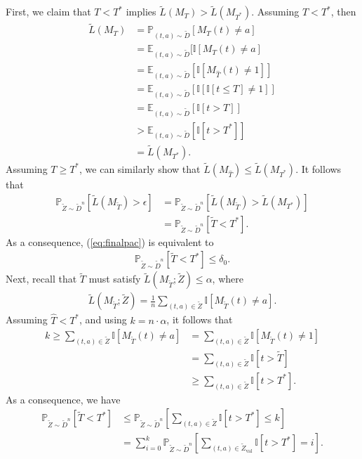 \documentclass{article} \usepackage{iclr2020_conference,times}
\renewcommand{\(}						{\left(}
\renewcommand{\)}						{\right)}
\renewcommand{\[}						{\left[}
\renewcommand{\]}						{\right]}
\newcommand{\<}						{\left<}
\renewcommand{\>}						{\right>}
\def\Th{\hat{{T}}}
\begin{document}
First, we claim that 
$T < T^*$ implies $\tilde{L}(M_T) > \tilde{L}(M_{T^*})$. Assuming $T < T^*$, then
\begin{align*}
\tilde{L}(M_T) 
&= \mathbb{P}_{(t,a)\sim\tilde{D}}[M_T(t)\neq a] \\
&= \mathbb{E}_{(t,a)\sim\tilde{D}}[\mathbb{I}[M_T (t)\neq a] \\
&= \mathbb{E}_{(t,a)\sim\tilde{D}}[\mathbb{I}[M_{\Th} (t)\neq 1]] \\
&= \mathbb{E}_{(t,a)\sim\tilde{D}}\left[\mathbb{I}[ \mathbb{I}[ t \leq T ] \neq 1]\right] \\
&= \mathbb{E}_{(t,a)\sim\tilde{D}}\left[\mathbb{I}[ t > T ]\right] \\
&> \mathbb{E}_{(t,a)\sim\tilde{D}}\left[\mathbb{I}[ t > T^* ]\right] \\
&= \tilde{L}(M_{T^*}).
\end{align*}
Assuming $T \geq T^{*}$, we can similarly show that $\tilde{L}(M_{\hat{T}}) \leq \tilde{L}(M_{T^*})$. It follows that
\begin{align*}
\mathbb{P}_{\tilde Z\sim\tilde{D}^n} \left[ \tilde{L}(M_{\tilde T}) > \epsilon \right]
&= \mathbb{P}_{\tilde{Z}\sim\tilde{D}^n} \left[ \tilde{L}(M_{\tilde T}) > \tilde{L}(M_{T^*}) \right] \\
&= \mathbb{P}_{\tilde{Z}\sim\tilde{D}^n}\left[\tilde{T}<T^*\right].
\end{align*}
As a consequence, (\ref{eq:finalpac}) is equivalent to
\begin{align*}
\mathbb{P}_{\tilde{Z}\sim\tilde{D}^n}\left[\tilde T<T^*\right] \le \delta_0.
\end{align*}
Next, recall that 
$\tilde{T}$ must satisfy $\tilde{L}(M_{\tilde{T}};\tilde Z)\le\alpha$, where
\begin{align*}
\tilde L(M_{\tilde T};\tilde Z) = \frac{1}{n} \sum_{(t,a) \in \tilde Z} \mathbb{I}[ M_{\tilde T}(t) \neq a ].
\end{align*}
Assuming $\Th < T^{*}$, and using $k=n\cdot\alpha$, it follows that
\begin{align*}
k
\ge\sum_{(t,a)\in\tilde{Z}}\mathbb{I}[M_{\tilde{T}}(t)\neq a]
&=\sum_{(t,a)\in\tilde{Z}}\mathbb{I}[M_{\tilde{T}}(t)\neq1] \\
&= \sum_{(t,a)\in\tilde{Z}}\mathbb{I}[t > \tilde{T}] \\
&\ge \sum_{(t,a)\in\tilde{Z}}\mathbb{I}[t > T^*].
\end{align*}
As a consequence, we have
\begin{align*}
\mathbb{P}_{\tilde{Z}\sim\tilde{D}^n}\left[\tilde{T}<T^*\right]
&\le\mathbb{P}_{\tilde{Z}\sim\tilde{D}^n}\left[\sum_{(t,a)\in\tilde{Z}}\mathbb{I}[t > T^*]\le k\right] \\
&= \sum_{i=0}^{k} \mathbb{P}_{\tilde{Z}\sim\tilde{D}^n}\left[\sum_{(t,a)\in\tilde{Z}_{\text{val}}}\mathbb{I}[t > T^*] = i\right].
\end{align*}
\end{document}
